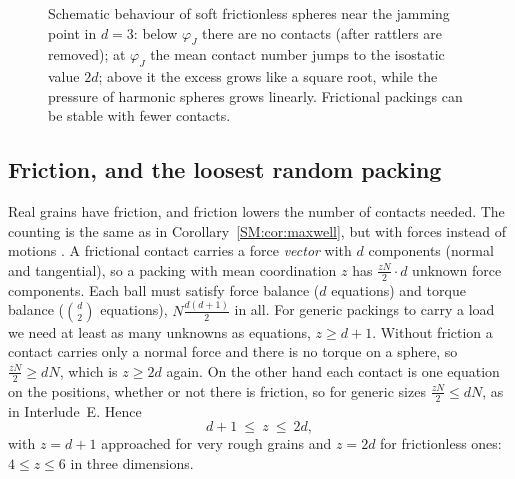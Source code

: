 \documentclass[11pt,openany]{book}
\theoremstyle{plain}
\theoremstyle{definition}
\theoremstyle{remark}
\begin{document}
\begin{figure}[ht]
\centering
{}
\caption{Schematic behaviour of soft frictionless spheres near the jamming point in $d=3$: below $\varphi_J$
there are no contacts (after rattlers are removed); at $\varphi_J$ the mean contact number jumps to the
isostatic value $2d$; above it the excess grows like a square root, while the pressure of harmonic spheres
grows linearly. Frictional packings can be stable with fewer contacts.}
\label{PHYS:fig:jam}
\end{figure}

\subsection*{Friction, and the loosest random packing}
Real grains have friction, and friction lowers the number of contacts needed. The counting is the same as
in Corollary~\ref{SM:cor:maxwell}, but with forces instead of motions . A frictional contact
carries a force \emph{vector} with $d$ components (normal and tangential), so a packing with mean
coordination $z$ has $\frac{zN}2\cdot d$ unknown force components. Each ball must satisfy force balance
($d$ equations) and torque balance ($\binom d2$ equations), $N\frac{d(d+1)}2$ in all. For generic packings
to carry a load we need at least as many unknowns as equations, $z\ge d+1$. Without friction a contact
carries only a normal force and there is no torque on a sphere, so $\frac{zN}2\ge dN$, which is $z\ge2d$
again. On the other hand each contact is one equation on the positions, whether or not there is friction,
so for generic sizes $\frac{zN}2\le dN$, as in Interlude~E. Hence
\[
  d+1\ \le\ z\ \le\ 2d,
\]
with $z=d+1$ approached for very rough grains and $z=2d$ for frictionless ones: $4\le z\le6$ in three
dimensions.
\end{document}
